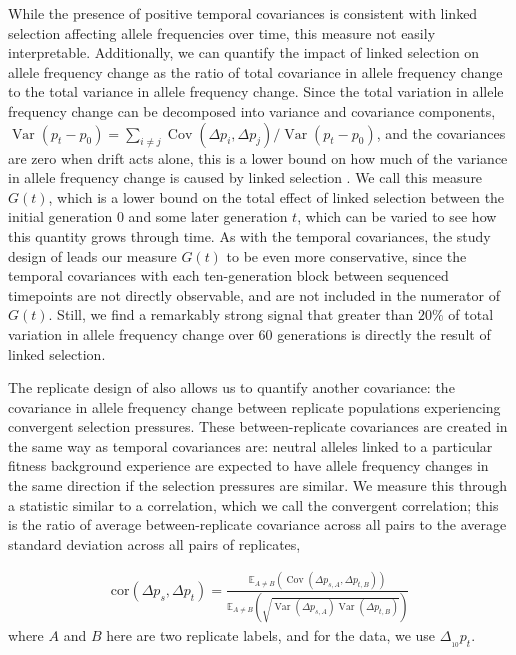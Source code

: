 \documentclass[11pt]{article}
\newcommand{\E}{\mathbb{E}}
\DeclareMathOperator{\var}{Var}
\DeclareMathOperator{\cov}{Cov}
\begin{document}
While the presence of positive temporal covariances is consistent with linked
selection affecting allele frequencies over time, this measure not easily
interpretable. Additionally, we can quantify the impact of linked selection on
allele frequency change as the ratio of total covariance in allele frequency
change to the total variance in allele frequency change. Since the total
variation in allele frequency change can be decomposed into variance and
covariance components, $\var(p_t - p_0) = \sum_{i \ne j} \cov(\Delta p_i,
\Delta p_j) / \var(p_t - p_0)$, and the covariances are zero when drift acts
alone, this is a lower bound on how much of the variance in allele frequency
change is caused by linked selection \parencite{Buffalo2019-io}. We call this
measure $G(t)$, which is a lower bound on the total effect of linked selection
between the initial generation $0$ and some later generation $t$, which can be
varied to see how this quantity grows through time. As with the temporal
covariances, the study design of \textcite{Barghi2019-qy} leads our measure
$G(t)$ to be even more conservative, since the temporal covariances with each
ten-generation block between sequenced timepoints are not directly observable,
and are not included in the numerator of $G(t)$. Still, we find a remarkably
strong signal that greater than $20\%$ of total variation in allele frequency
change over 60 generations is directly the result of linked selection.

The replicate design of \textcite{Barghi2019-qy} also allows us to quantify
another covariance: the covariance in allele frequency change between replicate
populations experiencing convergent selection pressures. These between-replicate
covariances are created in the same way as temporal covariances are: neutral
alleles linked to a particular fitness background experience are expected to
have allele frequency changes in the same direction if the selection pressures
are similar. We measure this through a statistic similar to a correlation,
which we call the convergent correlation; this is the ratio of average
between-replicate covariance across all pairs to the average standard deviation
across all pairs of replicates, 

\begin{align}
  \label{eq:conv-corr}
  \mathrm{cor}(\Delta p_s, \Delta p_t) = \frac{\E_{A\ne B} \left( \cov(\Delta p_{s,A}, \Delta p_{t,B}) \right)}{\E_{A\ne B} \left( \sqrt{\var(\Delta p_{s,A}) \var(\Delta p_{t,B})} \right)}
\end{align}
%
where $A$ and $B$ here are two replicate labels, and for the
\textcite{Barghi2019-qy} data, we use $\Delta_{_{10}} p_t$.
\end{document}
